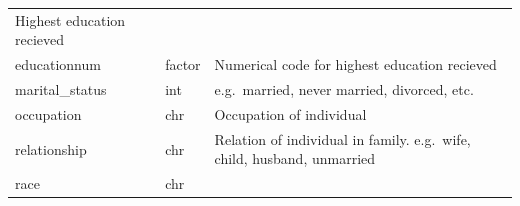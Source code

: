 \documentclass[]{article}
\begin{document}
\begin{longtable}[]{@{}lll@{}}
\begin{minipage}[t]{0.26\columnwidth}
Highest education recieved\strut
\end{minipage}\tabularnewline
\begin{minipage}[t]{0.35\columnwidth}\raggedright
educationnum\strut
\end{minipage} & \begin{minipage}[t]{0.30\columnwidth}\raggedright
factor\strut
\end{minipage} & \begin{minipage}[t]{0.26\columnwidth}\raggedright
Numerical code for highest education recieved\strut
\end{minipage}\tabularnewline
\begin{minipage}[t]{0.35\columnwidth}\raggedright
marital\_status\strut
\end{minipage} & \begin{minipage}[t]{0.30\columnwidth}\raggedright
int\strut
\end{minipage} & \begin{minipage}[t]{0.26\columnwidth}\raggedright
e.g.~married, never married, divorced, etc.\strut
\end{minipage}\tabularnewline
\begin{minipage}[t]{0.35\columnwidth}\raggedright
occupation\strut
\end{minipage} & \begin{minipage}[t]{0.30\columnwidth}\raggedright
chr\strut
\end{minipage} & \begin{minipage}[t]{0.26\columnwidth}\raggedright
Occupation of individual\strut
\end{minipage}\tabularnewline
\begin{minipage}[t]{0.35\columnwidth}\raggedright
relationship\strut
\end{minipage} & \begin{minipage}[t]{0.30\columnwidth}\raggedright
chr\strut
\end{minipage} & \begin{minipage}[t]{0.26\columnwidth}\raggedright
Relation of individual in family. e.g.~wife, child, husband,
unmarried\strut
\end{minipage}\tabularnewline
\begin{minipage}[t]{0.35\columnwidth}\raggedright
race\strut
\end{minipage} & \begin{minipage}[t]{0.30\columnwidth}\raggedright
chr\strut
\end{minipage} & \begin{minipage}[t]{0.26\columnwidth}\raggedright

\end{minipage}
\end{longtable}
\end{document}
